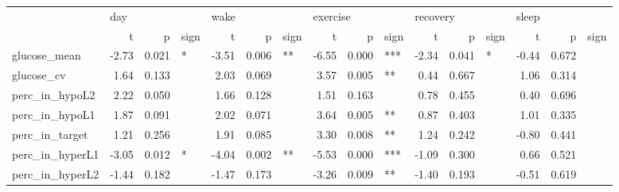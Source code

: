 \begin{tabular}{lrrlrrlrrlrrlrrl}
\toprule
{} & \multicolumn{3}{l}{day} & \multicolumn{3}{l}{wake} & \multicolumn{3}{l}{exercise} & \multicolumn{3}{l}{recovery} & \multicolumn{3}{l}{sleep} \\
{} &     t &      p & sign &     t &      p & sign &        t &      p & sign &        t &      p & sign &     t &      p & sign \\
\midrule
glucose_mean    & -2.73 &  0.021 &    * & -3.51 &  0.006 &   ** &    -6.55 &  0.000 &  *** &    -2.34 &  0.041 &    * & -0.44 &  0.672 &      \\
glucose_cv      &  1.64 &  0.133 &      &  2.03 &  0.069 &      &     3.57 &  0.005 &   ** &     0.44 &  0.667 &      &  1.06 &  0.314 &      \\
perc_in_hypoL2  &  2.22 &  0.050 &      &  1.66 &  0.128 &      &     1.51 &  0.163 &      &     0.78 &  0.455 &      &  0.40 &  0.696 &      \\
perc_in_hypoL1  &  1.87 &  0.091 &      &  2.02 &  0.071 &      &     3.64 &  0.005 &   ** &     0.87 &  0.403 &      &  1.01 &  0.335 &      \\
perc_in_target  &  1.21 &  0.256 &      &  1.91 &  0.085 &      &     3.30 &  0.008 &   ** &     1.24 &  0.242 &      & -0.80 &  0.441 &      \\
perc_in_hyperL1 & -3.05 &  0.012 &    * & -4.04 &  0.002 &   ** &    -5.53 &  0.000 &  *** &    -1.09 &  0.300 &      &  0.66 &  0.521 &      \\
perc_in_hyperL2 & -1.44 &  0.182 &      & -1.47 &  0.173 &      &    -3.26 &  0.009 &   ** &    -1.40 &  0.193 &      & -0.51 &  0.619 &      \\
\bottomrule
\end{tabular}
